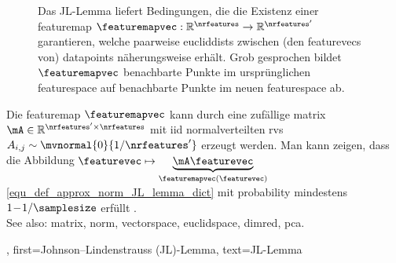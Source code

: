 {{{{{{\begin{figure}[hbtp]
		\caption{Das JL-Lemma liefert Bedingungen, die die Existenz einer 
		         \gls{featuremap} $\featuremapvec: \mathbb{R}^{\nrfeatures} \rightarrow \mathbb{R}^{\nrfeatures'}$ 
				 garantieren, welche paarweise \glspl{eucliddist} zwischen (den \glspl{featurevec} von) 
				 \glspl{datapoint} näherungsweise erhält. Grob gesprochen 
				 bildet $\featuremapvec$ benachbarte Punkte im ursprünglichen \gls{featurespace} 
				 auf benachbarte Punkte im neuen \gls{featurespace} ab.}
	\end{figure}
	Die \gls{featuremap} $\featuremapvec$ kann durch eine zufällige \gls{matrix} 
	$\mA \in \mathbb{R}^{\nrfeatures' \times \nrfeatures}$ mit \gls{iid} 
	normalverteilten \glspl{rv} $A_{i,j} \sim \mvnormal{0}{1/\nrfeatures'}$ erzeugt werden. 
	Man kann zeigen, dass die Abbildung $\featurevec \mapsto \underbrace{\mA \featurevec}_{\featuremapvec(\featurevec)}$ 
	\eqref{equ_def_approx_norm_JL_lemma_dict} mit \gls{probability} mindestens $1\!-\!1/\samplesize$ erfüllt 
	\cite{ProofJLlemma}. \\
  	See also: \gls{matrix}, \gls{norm}, \gls{vectorspace}, \gls{euclidspace}, \gls{dimred}, \gls{pca}.},
	first={Johnson--Lindenstrauss (JL)-Lemma},
	text={JL-Lemma}
}


}}}}
